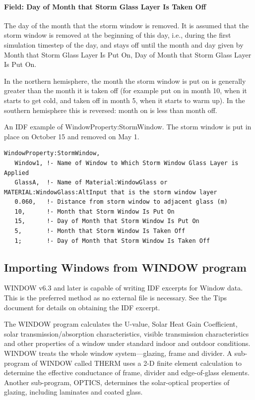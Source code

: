 \paragraph{Field: Day of Month that Storm Glass Layer Is Taken Off}\label{field-day-of-month-that-storm-glass-layer-is-taken-off}

The day of the month that the storm window is removed. It is assumed that the storm window is removed at the beginning of this day, i.e., during the first simulation timestep of the day, and stays off until the month and day given by Month that Storm Glass Layer Is Put On, Day of Month that Storm Glass Layer Is Put On.

In the northern hemisphere, the month the storm window is put on is generally greater than the month it is taken off (for example put on in month 10, when it starts to get cold, and taken off in month 5, when it starts to warm up). In the southern hemisphere this is reversed: month on is less than month off.

An IDF example of WindowProperty:StormWindow. The storm window is put in place on October 15 and removed on May 1.

\begin{lstlisting}
WindowProperty:StormWindow,
   Window1, !- Name of Window to Which Storm Window Glass Layer is Applied
   GlassA,  !- Name of Material:WindowGlass or MATERIAL:WindowGlass:AltInput that is the storm window layer
   0.060,   !- Distance from storm window to adjacent glass (m)
   10,      !- Month that Storm Window Is Put On
   15,      !- Day of Month that Storm Window Is Put On
   5,       !- Month that Storm Window Is Taken Off
   1;       !- Day of Month that Storm Window Is Taken Off
\end{lstlisting}

\subsection{Importing Windows from WINDOW program}\label{importing-windows-from-window-program}

\begin{callout}
WINDOW v6.3 and later is capable of writing IDF excerpts for Window data. This is the preferred method as no external file is necessary. See the Tips document for details on obtaining the IDF excerpt.
\end{callout}

The WINDOW program calculates the U-value, Solar Heat Gain Coefficient, solar transmission/absorption characteristics, visible transmission characteristics and other properties of a window under standard indoor and outdoor conditions. WINDOW treats the whole window system---glazing, frame and divider. A sub-program of WINDOW called THERM uses a 2-D finite element calculation to determine the effective conductance of frame, divider and edge-of-glass elements. Another sub-program, OPTICS, determines the solar-optical properties of glazing, including laminates and coated glass.

